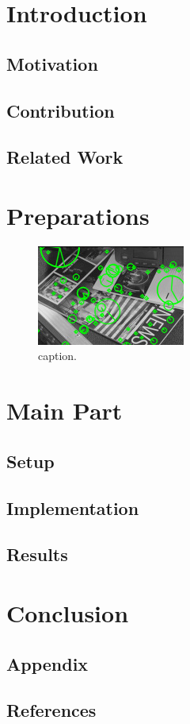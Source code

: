 \chapter{Introduction}
\label{chap:intro}

\section{Motivation}
\label{sect:motivation}
\section{Contribution}
\section{Related Work}
\chapter{Preparations}
\begin{figure}[!ht]
	\centering
	\includegraphics[width=0.9\linewidth]{image.jpg}
	\caption{caption.}
	\label{img:example}
\end{figure}
\chapter{Main Part}
\section{Setup}
\section{Implementation}
\section{Results}
\chapter{Conclusion}
\section{Appendix}

\section{References}
